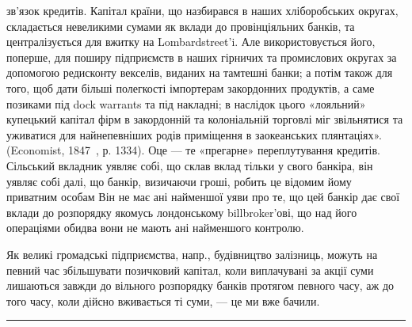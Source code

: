 зв’язок кредитів. Капітал країни, що назбирався в наших хліборобських
округах, складається невеликими сумами як вклади до провінціяльних банків,
та централізується для вжитку на Lombardstreet’i. Але використовується його,
поперше, для поширу підприємств в наших гірничих та промислових округах за
допомогою редисконту векселів, виданих на тамтешні банки; а потім також для того,
щоб дати більші полегкості імпортерам закордонних продуктів, а саме позиками
під dock warrants та під накладні; в наслідок цього «лояльний» купецький
капітал фірм в закордонній та колоніальній торговлі міг звільнятися та уживатися
для найнепевніших родів приміщення в заокеанських плянтаціях». (Economist,
1847~, р. 1334). Оце — те «прегарне» переплутування кредитів. Сільський
вкладник уявляє собі, що склав вклад тільки у свого банкіра, він уявляє собі
далі, що банкір, визичаючи гроші, робить це відомим йому приватним особам
Він не має ані найменшої уяви про те, що цей банкір дає свої вклади до розпорядку
якомусь лондонському billbroker’ові, що над його операціями обидва
вони не мають ані найменшого контролю.

Як великі громадські підприємства, напр., будівництво залізниць, можуть
на певний час збільшувати позичковий капітал, коли виплачувані за акції
суми лишаються завжди до вільного розпорядку банків протягом певного часу,
аж до того часу, коли дійсно вживається ті суми, — це ми вже бачили.
\pfbreak
